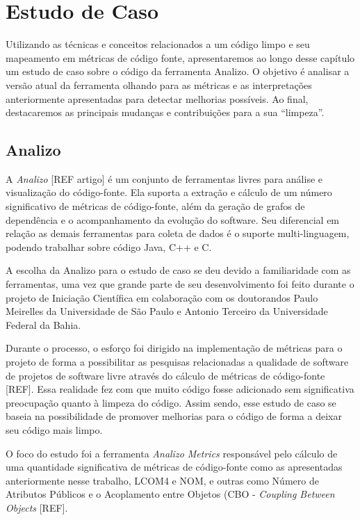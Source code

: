 \chapter{Estudo de Caso}
\label{chap:estudodecaso}


Utilizando as técnicas e conceitos relacionados a um código limpo e seu mapeamento 
em métricas de código fonte, apresentaremos ao longo desse capítulo um estudo de caso
sobre o código da ferramenta Analizo. O objetivo é analisar a versão atual da ferramenta
olhando para as métricas e as interpretações anteriormente apresentadas para detectar
melhorias possíveis. Ao final, destacaremos as principais mudanças e contribuições para
a sua ``limpeza''.


\section{Analizo}
A \textit{Analizo} [REF artigo] é um conjunto de ferramentas livres para análise e visualização
do código-fonte. Ela suporta a extração e cálculo de um número significativo de métricas
de código-fonte, além da geração de grafos de dependência e o acompanhamento da evolução do software.
Seu diferencial em relação as demais ferramentas para coleta de dados é o suporte multi-linguagem,
podendo trabalhar sobre código Java, C++ e C.

A escolha da Analizo para o estudo de caso se deu devido a familiaridade com as ferramentas, 
uma vez que grande parte de seu desenvolvimento foi feito durante o projeto de Iniciação
Científica em colaboração com os doutorandos Paulo Meirelles da Universidade de São Paulo
e Antonio Terceiro da Universidade Federal da Bahia.

Durante o processo, o esforço foi dirigido na implementação de métricas para o projeto
de forma a possibilitar as pesquisas relacionadas a qualidade de software de 
projetos de software livre através do cálculo de métricas de código-fonte [REF]. Essa
realidade fez com que muito código fosse adicionado sem significativa preocupação quanto
à limpeza do código. Assim sendo, esse estudo de caso se baseia na possibilidade de promover
melhorias para o código de forma a deixar seu código mais limpo.

O foco do estudo foi a ferramenta \textit{Analizo Metrics} responsável pelo cálculo de
uma quantidade significativa de métricas de código-fonte como as apresentadas anteriormente
nesse trabalho, LCOM4 e NOM, e outras como Número de Atributos Públicos e o Acoplamento
entre Objetos (CBO - \textit{Coupling Between Objects} [REF].

